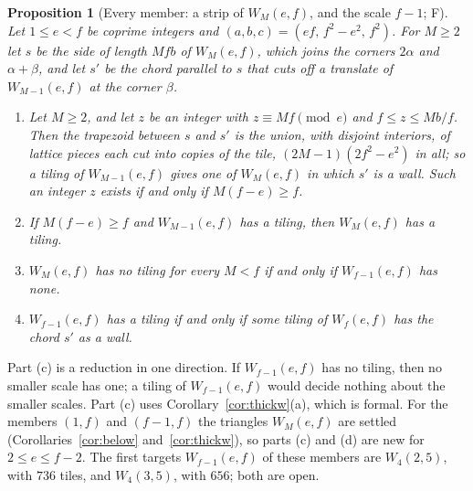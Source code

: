 \documentclass[11pt,reqno]{amsart}
\theoremstyle{plain}
\newtheorem{proposition}[theorem]{Proposition}
\theoremstyle{definition}
\newcommand{\sF}{\textup{\textsf{F}}}
\begin{document}
\begin{proposition}[Every member: a strip of $W_M(e,f)$, and the scale $f-1$; \sF]\label{prop:wstrip}
Let $1\le e<f$ be coprime integers and $(a,b,c)=(ef,\,f^2-e^2,\,f^2)$. For $M\ge2$ let $s$ be the side of
length $Mfb$ of $W_M(e,f)$, which joins the corners $2\alpha$ and $\alpha+\beta$, and let $s'$ be the chord
parallel to $s$ that cuts off a translate of $W_{M-1}(e,f)$ at the corner $\beta$.
\begin{enumerate}
\item[\textup{(a)}] Let $M\ge2$, and let $z$ be an integer with $z\equiv Mf\pmod e$ and $f\le z\le Mb/f$. Then
the trapezoid between $s$ and $s'$ is the union, with disjoint interiors, of lattice pieces each cut into copies of
the tile, $(2M-1)(2f^2-e^2)$ in all; so a tiling of $W_{M-1}(e,f)$ gives one of $W_M(e,f)$ in which $s'$ is a wall.
Such an integer $z$ exists if and only if $M(f-e)\ge f$.
\item[\textup{(b)}] If $M(f-e)\ge f$ and $W_{M-1}(e,f)$ has a tiling, then $W_M(e,f)$ has a tiling.
\item[\textup{(c)}] $W_M(e,f)$ has no tiling for every $M<f$ if and only if $W_{f-1}(e,f)$ has none.
\item[\textup{(d)}] $W_{f-1}(e,f)$ has a tiling if and only if some tiling of $W_f(e,f)$ has the chord $s'$ as
a wall.
\end{enumerate}
\end{proposition}

Part \textup{(c)} is a reduction in one direction. If $W_{f-1}(e,f)$ has no tiling, then no smaller scale has
one; a tiling of $W_{f-1}(e,f)$ would decide nothing about the smaller scales. Part \textup{(c)} uses
Corollary~\ref{cor:thickw}\textup{(a)}, which is formal. For the members $(1,f)$ and $(f-1,f)$
the triangles $W_M(e,f)$ are settled (Corollaries~\ref{cor:below} and~\ref{cor:thickw}), so parts \textup{(c)}
and \textup{(d)} are new for $2\le e\le f-2$. The first targets $W_{f-1}(e,f)$ of these members are $W_4(2,5)$,
with $736$ tiles, and $W_4(3,5)$, with $656$; both are open.
\end{document}

